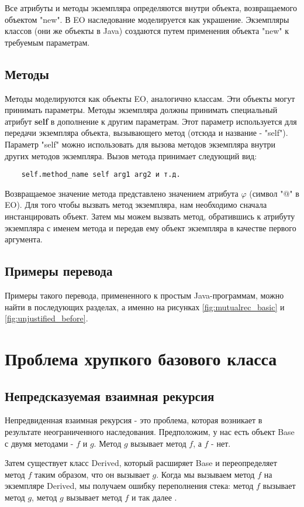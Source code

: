 Все атрибуты и методы экземпляра определяются внутри объекта, возвращаемого объектом "new". В EO наследование моделируется как украшение. Экземпляры классов (они же объекты в Java) создаются
путем применения объекта "new" к требуемым параметрам.

\subsection{Методы}
Методы моделируются как объекты EO, аналогично классам. Эти объекты могут принимать параметры.
Методы экземпляра должны принимать специальный атрибут \textbf{self} в дополнение к другим параметрам. Этот параметр используется для передачи экземпляра объекта, вызывающего метод (отсюда и название - "self").
Параметр "self" можно использовать для вызова методов экземпляра внутри других методов экземпляра. Вызов метода принимает следующий вид:
\begin{lstlisting}
    self.method_name self arg1 arg2 и т.д.
\end{lstlisting}

Возвращаемое значение метода представлено значением атрибута $\varphi$ (символ "@" в EO). Для того чтобы вызвать метод экземпляра, нам необходимо сначала инстанцировать объект. Затем мы можем вызвать метод, обратившись к атрибуту экземпляра с именем метода и передав ему объект экземпляра в качестве первого аргумента.

\subsection{Примеры перевода}
Примеры такого перевода, примененного к простым Java-программам, можно найти в последующих разделах, а именно на рисунках \ref{fig:mutualrec_basic} и \ref{fig:unjustified_before}.
\section{Проблема хрупкого базового класса}

\subsection{Непредсказуемая взаимная рекурсия}
Непредвиденная взаимная рекурсия - это проблема, которая возникает в результате неограниченного наследования. Предположим, у нас есть объект Base с двумя методами - $f$ и $g$. Метод $g$ вызывает метод $f$, а $f$ - нет.


Затем существует класс Derived, который расширяет Base и переопределяет метод $f$ таким образом, что он вызывает $g$. Когда мы вызываем метод $f$ на экземпляре Derived, мы получаем ошибку переполнения стека: метод $f$ вызывает метод $g$, метод $g$ вызывает метод $f$ и так далее .

